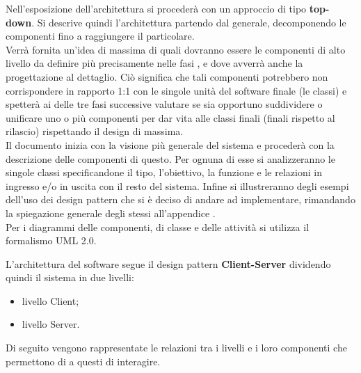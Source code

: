 Nell'esposizione dell'architettura si procederà con un approccio di tipo \textbf{top-down}. Si descrive quindi l’architettura partendo dal generale, decomponendo le componenti fino a raggiungere il particolare.\\
Verrà fornita un'idea di massima di quali dovranno essere le componenti di alto livello da definire più precisamente nelle fasi ,  e  dove avverrà anche la progettazione al dettaglio. Ciò significa che tali componenti potrebbero non corrispondere in rapporto 1:1 con le singole unità del software finale (le classi) e spetterà ai  delle tre fasi successive valutare se sia opportuno suddividere o unificare uno o più componenti per dar vita alle classi finali (finali rispetto al rilascio) rispettando il design di massima.\\
Il documento inizia con la visione più generale del sistema e procederà con la descrizione delle componenti di questo. Per ognuna di esse si analizzeranno le singole classi specificandone il tipo, l'obiettivo, la funzione e le relazioni in ingresso e/o in uscita con il resto del sistema. Infine si illustreranno degli esempi dell'uso dei design pattern che si è deciso di andare ad implementare, rimandando la spiegazione generale degli stessi all'appendice .\\
Per i diagrammi delle componenti, di classe e delle attività si utilizza il formalismo UML 2.0. 


L'architettura del software segue il design pattern \textbf{Client-Server} dividendo quindi il sistema in due livelli:
\begin{itemize}
	\item{livello Client};
	\item{livello Server}.
\end{itemize}
Di seguito vengono rappresentate le relazioni tra i livelli e i loro componenti che permettono di a questi di interagire.


